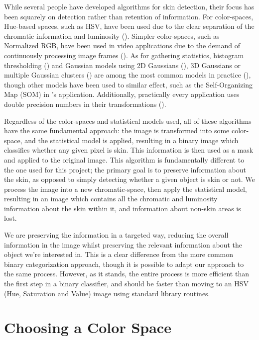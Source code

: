 While several people have developed algorithms for skin detection, their focus has been squarely on detection rather than retention of information. For color-spaces, Hue-based spaces, such as HSV, have been used due to the clear separation of the chromatic information and luminosity (\cite{Zarit1999a,Sigal2000a}). Simpler color-spaces, such as Normalized RGB, have been used in video applications due to the demand of continuously processing image frames (\cite{Soriano2000a}). As for gathering statistics, histogram thresholding (\cite{Soriano2000a,Sigal2000a}) and Gaussian models using 2D Gaussians (\cite{Terrillon1999a}), 3D Gaussians or multiple Gaussian clusters (\cite{Vezhnevets2003}) are among the most common models in practice (\cite{Shin2002a}), though other models have been used to similar effect, such as the Self-Organizing Map (SOM) in \cite{Brown2001a}'s application. Additionally, practically every application uses double precision numbers in their transformations (\cite{Shin2002a,Vezhnevets2003,Terrillon1999a}).

Regardless of the color-spaces and statistical models used, all of these algorithms have the same fundamental approach: the image is transformed into some color-space, and the statistical model is applied, resulting in a binary image which classifies whether any given pixel is skin. This information is then used as a mask and applied to the original image. This algorithm is fundamentally different to the one used for this project; the primary goal is to preserve information about the skin, as opposed to simply detecting whether a given object is skin or not. We process the image into a new chromatic-space, then apply the statistical model, resulting in an image which contains all the chromatic and luminosity information about the skin within it, and information about non-skin areas is lost. 

We are preserving the information in a targeted way, reducing the overall information in the image whilst preserving the relevant information about the object we're interested in. This is a clear difference from the more common binary categorization approach, though it is possible to adapt our approach to the same process. However, as it stands, the entire process is more efficient than the first step in a binary classifier, and should be faster than moving to an HSV (Hue, Saturation and Value) image using standard library routines.


\section{Choosing a Color Space}

